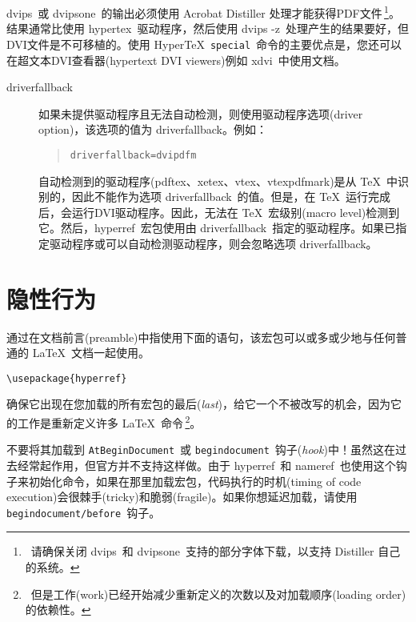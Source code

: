 \documentclass{article}
\newcommand*{\xpackage}[1]{\textsf{#1}}
\newcommand{\bs}{\symbol{'134}}%
\newcommand{\ci}[1]{\texttt{\bs#1}}
\begin{document}
\textsf{dvips}\ 或 \textsf{dvipsone}\ 的输出必须使用 Acrobat Distiller 处理才能获得PDF文件\,\footnote{\ 请确保关闭 \textsf{dvips}\ 和 \textsf{dvipsone}\ 支持的部分字体下载，以支持 Distiller 自己的系统。}。结果通常比使用 \textsf{hypertex}\ 驱动程序，然后使用 \textsf{dvips -z}\ 处理产生的结果要好，但DVI文件是不可移植的。使用 Hyper\TeX\ \ci{special}\ 命令的主要优点是，您还可以在超文本DVI查看器(hypertext DVI viewers)例如 \textsf{xdvi}\ 中使用文档。

\begin{description}
    \item[driverfallback]
          如果未提供驱动程序且无法自动检测，则使用驱动程序选项(driver option)，该选项的值为 \textsf{driverfallback}。例如：
          \begin{quote}
              \texttt{driverfallback=dvipdfm}
          \end{quote}
          自动检测到的驱动程序(\textsf{pdftex}、\textsf{xetex}、\textsf{vtex}、\textsf{vtexpdfmark})是从 \TeX\ 中识别的，因此不能作为选项 \textsf{driverfallback}\ 的值。但是，在 \TeX\ 运行完成后，会运行DVI驱动程序。因此，无法在 \TeX\ 宏级别(macro level)检测到它。然后，\xpackage{hyperref}\ 宏包使用由 \textsf{driverfallback}\ 指定的驱动程序。如果已指定驱动程序或可以自动检测驱动程序，则会忽略选项 \textsf{driverfallback}。
\end{description}

\newpage
\section{\heiti 隐性行为}

通过在文档前言(preamble)中指使用下面的语句，该宏包可以或多或少地与任何普通的 \LaTeX\ 文档一起使用。
{\large \color{blue}
\begin{verbatim}
\usepackage{hyperref}
\end{verbatim} }

确保它出现在您加载的所有宏包的{\kaiti 最后}(\emph{last})，给它一个不被改写的机会，因为它的工作是重新定义许多 \LaTeX\ 命令\,\footnote{\ 但是工作(work)已经开始减少重新定义的次数以及对加载顺序(loading order)的依赖性。}。

{\kaiti 不要将其加载到} \ci{AtBeginDocument}\ {\kaiti 或} \texttt{begindocument}\ {\kaiti 钩子}(\emph{hook}){\kaiti 中！}虽然这在过去经常起作用，但官方并不支持这样做。由于 \xpackage{hyperref}\ 和 \xpackage{nameref}\ 也使用这个钩子来初始化命令，如果在那里加载宏包，代码执行的时机(timing of code execution)会很棘手(tricky)和脆弱(fragile)。如果你想延迟加载，请使用 \texttt{begindocument/before}\ 钩子。
\end{document}
